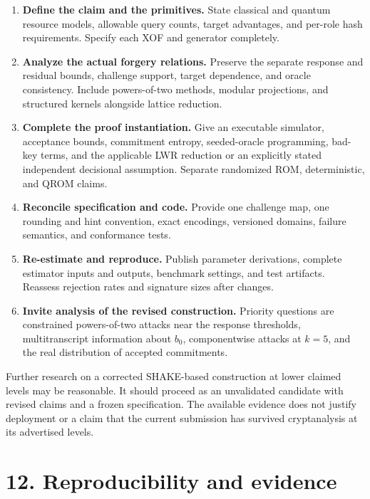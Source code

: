\documentclass[
  american,
  10pt,
  a4paper,
]{article}
\providecommand{\tightlist}{%
  \setlength{\itemsep}{0pt}\setlength{\parskip}{0pt}}
\begin{document}
\begin{enumerate}
\def\labelenumi{\arabic{enumi}.}
\tightlist
\item
  \textbf{Define the claim and the primitives.} State classical and
  quantum resource models, allowable query counts, target advantages,
  and per-role hash requirements. Specify each XOF and generator
  completely.
\item
  \textbf{Analyze the actual forgery relations.} Preserve the separate
  response and residual bounds, challenge support, target dependence,
  and oracle consistency. Include powers-of-two methods, modular
  projections, and structured kernels alongside lattice reduction.
\item
  \textbf{Complete the proof instantiation.} Give an executable
  simulator, acceptance bounds, commitment entropy, seeded-oracle
  programming, bad-key terms, and the applicable LWR reduction or an
  explicitly stated independent decisional assumption. Separate
  randomized ROM, deterministic, and QROM claims.
\item
  \textbf{Reconcile specification and code.} Provide one challenge map,
  one rounding and hint convention, exact encodings, versioned domains,
  failure semantics, and conformance tests.
\item
  \textbf{Re-estimate and reproduce.} Publish parameter derivations,
  complete estimator inputs and outputs, benchmark settings, and test
  artifacts. Reassess rejection rates and signature sizes after changes.
\item
  \textbf{Invite analysis of the revised construction.} Priority
  questions are constrained powers-of-two attacks near the response
  thresholds, multitranscript information about \(b_0\), componentwise
  attacks at \(k=5\), and the real distribution of accepted commitments.
\end{enumerate}

Further research on a corrected SHAKE-based construction at lower
claimed levels may be reasonable. It should proceed as an unvalidated
candidate with revised claims and a frozen specification. The available
evidence does not justify deployment or a claim that the current
submission has survived cryptanalysis at its advertised levels.

\section{12. Reproducibility and
evidence}\label{reproducibility-and-evidence}
\end{document}
